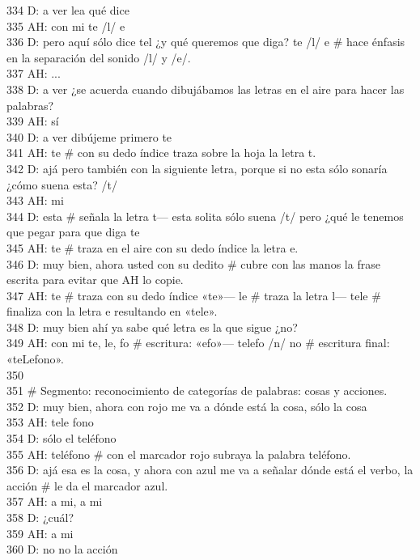 334 D: a ver lea qué dice\\
335 AH: con mi te /l/ e\\
336 D: pero aquí sólo dice tel ¿y qué queremos que diga? te /l/ e \# hace énfasis en la separación del sonido /l/ y /e/.\\
337 AH: ...\\
338 D: a ver ¿se acuerda cuando dibujábamos las letras en el aire para hacer las palabras?\\
339 AH: sí\\
340 D: a ver dibújeme primero te\\
341 AH: te \# con su dedo índice traza sobre la hoja la letra t.\\
342 D: ajá pero también con la siguiente letra, porque si no esta sólo sonaría ¿cómo suena esta? /t/\\
343 AH: mi\\
344 D: esta \# señala la letra t--- esta solita sólo suena /t/ pero ¿qué le tenemos que pegar para que diga te\\
345 AH: te \# traza en el aire con su dedo índice la letra e.\\
346 D: muy bien, ahora usted con su dedito \# cubre con las manos la frase escrita para evitar que AH lo copie.\\
347 AH: te \# traza con su dedo índice «te»--- le \# traza la letra l--- tele \# finaliza con la letra e resultando en «tele».\\
348 D: muy bien ahí ya sabe qué letra es la que sigue ¿no?\\
349 AH: con mi te, le, fo \# escritura: «efo»--- telefo /n/ no \# escritura final: «teLefono».\\
350 \\
351 \# Segmento: reconocimiento de categorías de palabras: cosas y acciones.\\
352 D: muy bien, ahora con rojo me va a dónde está la cosa, sólo la cosa\\
353 AH: tele fono\\
354 D: sólo el teléfono\\
355 AH: teléfono \# con el marcador rojo subraya la palabra teléfono.\\
356 D: ajá esa es la cosa, y ahora con azul me va a señalar dónde está el verbo, la acción \# le da el marcador azul.\\
357 AH: a mi, a mi\\
358 D: ¿cuál?\\
359 AH: a mi\\
360 D: no no la acción\\
